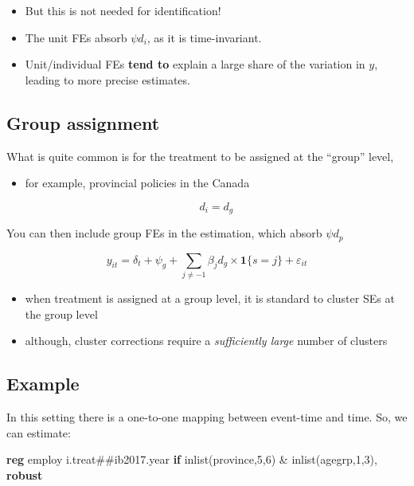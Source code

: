 \documentclass[
  letterpaper,
  DIV=11,
  numbers=noendperiod]{scrartcl}
\newenvironment{Shaded}{\begin{snugshade}}{\end{snugshade}}
\newcommand{\FunctionTok}[1]{\textcolor[rgb]{0.28,0.35,0.67}{#1}}
\newcommand{\KeywordTok}[1]{\textcolor[rgb]{0.00,0.23,0.31}{\textbf{#1}}}
\newcommand{\NormalTok}[1]{\textcolor[rgb]{0.00,0.23,0.31}{#1}}
\begin{document}
\begin{itemize}
\item
  But this is not needed for identification!
\item
  The unit FEs absorb \(\psi d_i\), as it is time-invariant.
\item
  Unit/individual FEs \textbf{tend to} explain a large share of the
  variation in \(y\), leading to more precise estimates.
\end{itemize}

\subsection{Group assignment}\label{group-assignment}

What is quite common is for the treatment to be assigned at the
``group'' level,

\begin{itemize}
\item
  for example, provincial policies in the Canada

  \[
    d_i = d_g
  \]
\end{itemize}

You can then include group FEs in the estimation, which absorb
\(\psi d_p\)

\[
  y_{it} = \delta_t + \psi_g + \sum_{j\neq-1}\beta_jd_g\times\mathbf{1}\{s=j\} + \varepsilon_{it}
\]

\begin{itemize}
\item
  when treatment is assigned at a group level, it is standard to cluster
  SEs at the group level
\item
  although, cluster corrections require a \emph{sufficiently large}
  number of clusters
\end{itemize}

\subsection{Example}\label{example-1}

In this setting there is a one-to-one mapping between event-time and
time. So, we can estimate:

\begin{Shaded}
\begin{Highlighting}[]
\KeywordTok{reg}\NormalTok{ employ i.treat\#\#ib2017.}\FunctionTok{year} \KeywordTok{if} \FunctionTok{inlist}\NormalTok{(province,5,6) \& }\FunctionTok{inlist}\NormalTok{(agegrp,1,3), }\KeywordTok{robust}
\end{Highlighting}
\end{Shaded}
\end{document}
